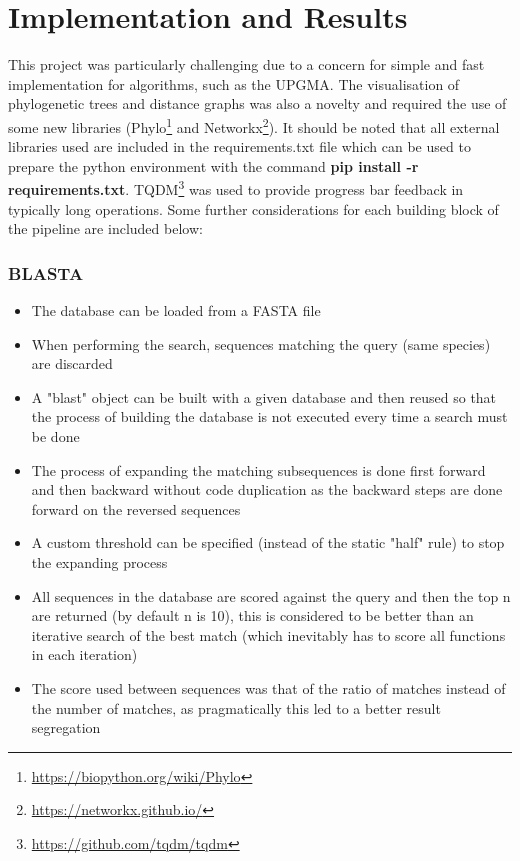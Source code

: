 \documentclass[11pt]{article}
\begin{document}
\section{Implementation and Results}
This project was particularly challenging due to a concern for simple and fast implementation for algorithms, such as the UPGMA. The visualisation of phylogenetic trees and distance graphs was also a novelty and required the use of some new libraries (Phylo\footnote{\url{https://biopython.org/wiki/Phylo}} and Networkx\footnote{\url{https://networkx.github.io/}}). It should be noted that all external libraries used are included in the requirements.txt file which can be used to prepare the python environment with the command \textbf{pip install -r requirements.txt}. TQDM\footnote{\url{https://github.com/tqdm/tqdm}} was used to provide progress bar feedback in typically long operations. Some further considerations for each building block of the pipeline are included below:

\subsubsection{BLASTA}
\begin{itemize}
    \itemsep0em
    \item The database can be loaded from a FASTA file
    \item When performing the search, sequences matching the query (same species) are discarded
    \item A "blast" object can be built with a given database and then reused so that the process of building the database is not executed every time a search must be done
    \item The process of expanding the matching subsequences is done first forward and then backward without code duplication as the backward steps are done forward on the reversed sequences
    \item A custom threshold can be specified (instead of the static "half" rule) to stop the expanding process
    \item All sequences in the database are scored against the query and then the top n are returned (by default n is 10), this is considered to be better than an iterative search of the best match (which inevitably has to score all functions in each iteration)
    \item The score used between sequences was that of the ratio of matches instead of the number of matches, as pragmatically this led to a better result segregation
\end{itemize}
\end{document}
